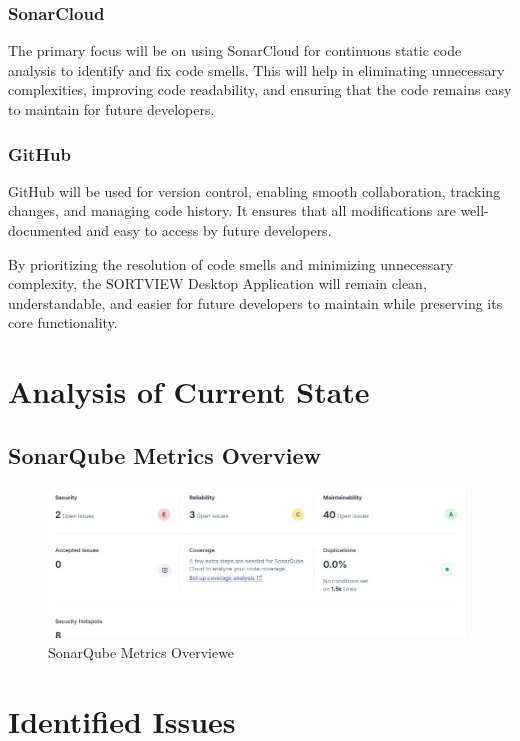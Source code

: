 \documentclass[12pt,a4paper]{article}
\begin{document}
\subsubsection{SonarCloud}
The primary focus will be on using SonarCloud for continuous static code analysis to identify and fix code smells. This will help in eliminating unnecessary complexities, improving code readability, and ensuring that the code remains easy to maintain for future developers.
\subsubsection{GitHub}
GitHub will be used for version control, enabling smooth collaboration, tracking changes, and managing code history. It ensures that all modifications are well-documented and easy to access by future developers.

By prioritizing the resolution of code smells and minimizing unnecessary complexity, the SORTVIEW Desktop Application will remain clean, understandable, and easier for future developers to maintain while preserving its core functionality.

\section{Analysis of Current State}
\subsection{SonarQube Metrics Overview}
\begin{figure}[H]
    \centering
    \includegraphics[width=1\textwidth]{SonarQube Metrics Overview.jpg}
    \caption{SonarQube Metrics Overviewe}
    \label{fig:SMO}
\end{figure}

\section{Identified Issues}
\end{document}
